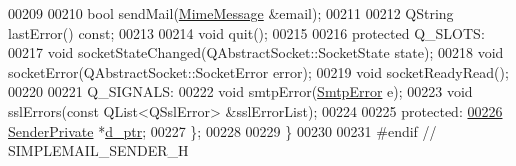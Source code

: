 \begin{DoxyCode}
00209 
00210     \textcolor{keywordtype}{bool} sendMail(\hyperlink{class_simple_mail_1_1_mime_message}{MimeMessage} &email);
00211 
00212     QString lastError() \textcolor{keyword}{const};
00213 
00214     \textcolor{keywordtype}{void} quit();
00215 
00216 \textcolor{keyword}{protected} Q\_SLOTS:
00217     \textcolor{keywordtype}{void} socketStateChanged(QAbstractSocket::SocketState state);
00218     \textcolor{keywordtype}{void} socketError(QAbstractSocket::SocketError error);
00219     \textcolor{keywordtype}{void} socketReadyRead();
00220 
00221 Q\_SIGNALS:
00222     \textcolor{keywordtype}{void} smtpError(\hyperlink{class_simple_mail_1_1_sender_a276560e9e955ab6be451338c3776bf49}{SmtpError} e);
00223     \textcolor{keywordtype}{void} sslErrors(\textcolor{keyword}{const} QList<QSslError> &sslErrorList);
00224 
00225 \textcolor{keyword}{protected}:
\hyperlink{class_simple_mail_1_1_sender_a0616c34e23dc61b19e5f50f43000669b}{00226}     \hyperlink{class_simple_mail_1_1_sender_private}{SenderPrivate} *\hyperlink{class_simple_mail_1_1_sender_a0616c34e23dc61b19e5f50f43000669b}{d\_ptr};
00227 \};
00228 
00229 \}
00230 
00231 \textcolor{preprocessor}{#endif // SIMPLEMAIL\_SENDER\_H}
\end{DoxyCode}
